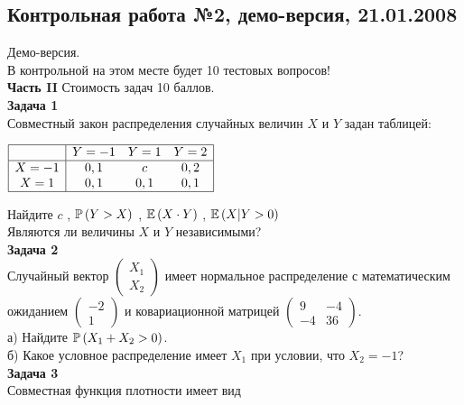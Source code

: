 \documentclass[12pt, a4paper]{article}\usepackage[]{graphicx}\usepackage[]{color}
\begin{document}
\subsection{Контрольная работа №2, демо-версия, 21.01.2008}

Демо-версия. \\

В контрольной на этом месте будет 10 тестовых вопросов! \\


\textbf{Часть II} Стоимость задач 10 баллов. \\

\textbf{Задача 1} \\ %
Совместный закон распределения случайных величин  $X$  и  $Y$
задан таблицей:

$\begin{array}{|c|ccc|}
\hline
{} & {Y=-1} & {Y=1} & {Y=2}\\
\hline
{X=-1} & {0,1} & {c} & {0,2}\\
{X=1} & {0,1} & {0,1} & {0,1} \\
\hline
\end{array}$

Найдите  $c$ ,  $\P\left(Y>X\right)$ ,  $\E\left(X\cdot Y
\right)$ ,  $\E\left(X|Y>0\right)$ \\
Являются ли величины $X$ и $Y$ независимыми? \\

\textbf{Задача 2} \\ %
Случайный вектор  $\left(\begin{array}{c}
{X_{1} } \\ {X_{2} }
\end{array}\right)$  имеет нормальное распределение с
математическим ожиданием  $\left(\begin{array}{c} {-2} \\ {1}
\end{array}\right)$  и ковариационной матрицей
$\left(\begin{array}{cc} {9} & {-4} \\ {-4} & {36}
\end{array}\right)$. \\
а) Найдите  $\P\left(X_{1} +X_{2} >0\right)$. \\
б) Какое условное распределение имеет $X_{1}$ при условии, что $X_{2}=-1$? \\

\textbf{Задача 3} \\ %
Совместная функция плотности имеет вид
\end{document}

